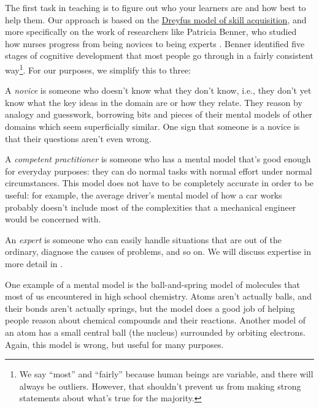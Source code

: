 
The first task in teaching is to figure out who your learners are and
how best to help them.  Our approach is based on the
\href{https://en.wikipedia.org/wiki/Dreyfus\_model\_of\_skill\_acquisition}{Dreyfus
model of skill acquisition}, and more specifically on the work of
researchers like Patricia Benner, who studied how nurses progress from
being novices to being experts \cite{bib:benner}.  Benner identified five
stages of cognitive development that most people go through in a
fairly consistent way\footnote{We say ``most'' and ``fairly'' because
human beings are variable, and there will always be outliers.
However, that shouldn't prevent us from making strong statements about
what's true for the majority.}. For our purposes, we simplify this to
three:

\begin{gitemize}

\item
  A \emph{novice} is someone who doesn't know what they don't know,
  i.e., they don't yet know what the key ideas in the domain are or
  how they relate. They reason by analogy and guesswork, borrowing
  bits and pieces of their mental models of other domains which seem
  superficially similar. One sign that someone is a novice is that
  their questions aren't even wrong.

\item
  A \emph{competent practitioner} is someone who has a mental model
  that's good enough for everyday purposes: they can do normal tasks
  with normal effort under normal circumstances. This model does not
  have to be completely accurate in order to be useful: for example,
  the average driver's mental model of how a car works probably
  doesn't include most of the complexities that a mechanical engineer
  would be concerned with.

\item
  An \emph{expert} is someone who can easily handle situations that are
  out of the ordinary, diagnose the causes of problems, and so on. We
  will discuss expertise in more detail in .

\end{gitemize}

One example of a mental model is the ball-and-spring model of
molecules that most of us encountered in high school chemistry. Atoms
aren't actually balls, and their bonds aren't actually springs, but
the model does a good job of helping people reason about chemical
compounds and their reactions.  Another model of an atom has a small
central ball (the nucleus) surrounded by orbiting electrons.  Again,
this model is wrong, but useful for many purposes.

